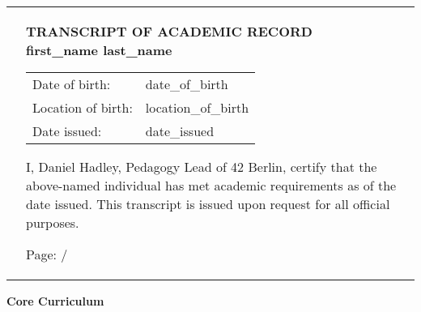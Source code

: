 \documentclass[11pt]{article}
\begin{document}
{{{\begin{tabularx}{\textwidth}{@{}X X@{}}
  &
  \begin{minipage}[t]{\linewidth}
    \parbox[t]{\dimexpr\linewidth-2\fboxsep}{ %
      \textbf{\large TRANSCRIPT OF ACADEMIC RECORD} \\ [0.5em]
	  \textbf{\large {{ first_name }} {{ last_name }}} \\[0.7em]
		\begin{tabular}{@{}l l@{}}
			Date of birth: & {{ date_of_birth }} \\
			Location of birth: & {{ location_of_birth }} \\
			Date issued: & {{ date_issued }} \\
		\end{tabular}


      \vspace{0.38cm}
    	I, Daniel Hadley, Pedagogy Lead of 42 Berlin, certify that the above-named individual has met academic requirements as of the date issued. 
		This transcript is issued upon request for all official purposes. \\
		\vspace{-0.5cm}
		\begin{flushright}
		Page: \thepage{} / \pageref{LastPage}
		\end{flushright}
    }
  \end{minipage}
  \end{tabularx}
  \vspace{-0.4cm}
}

\myHeader

\begin{center}
  \textbf{\large Core Curriculum}
\end{center}

\noindent
\begin{tabularx}{\textwidth}{l X r r}


\end{tabularx}}}
\end{document}
